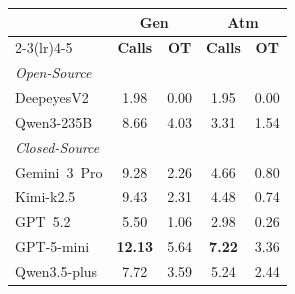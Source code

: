 \documentclass[runningheads]{llncs}
\theoremstyle{plain}
\theoremstyle{definition}
\theoremstyle{remark}
\begin{document}
\begin{figure}[t]
\begin{minipage}[t]{0.54\textwidth}
    \centering
    \vspace{0pt}
    \scriptsize
    \setlength{\tabcolsep}{7pt}
    \setlength{\aboverulesep}{0pt}
    \setlength{\belowrulesep}{0pt}
    \begin{tabular}{l cc cc}
        \toprule
        \rowcolor{CadetBlue!20}
        & \multicolumn{2}{c}{\textbf{Gen}}
        & \multicolumn{2}{c}{\textbf{Atm}} \\
        \cmidrule(lr){2-3}\cmidrule(lr){4-5}
        \rowcolor{CadetBlue!20}
        \multirow{-2}{*}{\textbf{Model}}
        & \textbf{Calls} & \textbf{OT}
        & \textbf{Calls} & \textbf{OT} \\
        \midrule
        \multicolumn{5}{l}{\cellcolor{colorOpen}%
          \textit{Open-Source}} \\
        DeepeyesV2    & 1.98  & 0.00 & 1.95 & 0.00 \\
        Qwen3-235B    & 8.66  & 4.03 & 3.31 & 1.54 \\
        \midrule
        \multicolumn{5}{l}{\cellcolor{colorClosed}%
          \textit{Closed-Source}} \\
        Gemini~3~Pro  & 9.28  & 2.26 & 4.66 & 0.80 \\
        Kimi-k2.5     & 9.43  & 2.31 & 4.48 & 0.74 \\
        GPT~5.2       & 5.50  & 1.06 & 2.98 & 0.26 \\
        GPT-5-mini    & \textbf{12.13} & 5.64 & \textbf{7.22} & 3.36 \\
        Qwen3.5-plus  & 7.72  & 3.59 & 5.24 & 2.44 \\
        \bottomrule
    \end{tabular}
    \label{tab:overthink}
\end{minipage}
\hspace{1mm}
\begin{minipage}[t]{0.43\textwidth}
    \centering
    \vspace{0pt}
    \scriptsize
    \setlength{\tabcolsep}{4pt}
    \renewcommand{\arraystretch}{2.2}

\end{minipage}
\end{figure}
\end{document}
